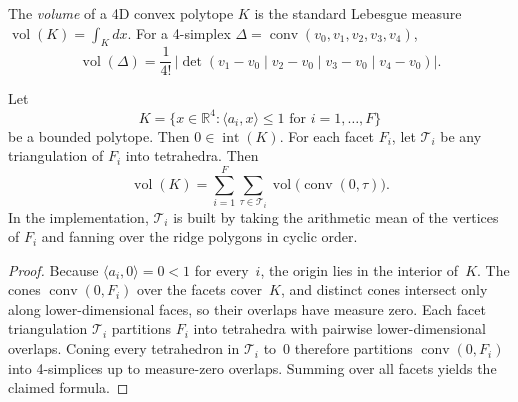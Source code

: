
\begin{unverified}
\begin{definition}\label{def:volume}
The \emph{volume} of a 4D convex polytope $K$ is the standard
Lebesgue measure $\operatorname{vol}(K) = \int_K dx$.
For a 4-simplex $\Delta = \operatorname{conv}(v_0,v_1,v_2,v_3,v_4)$,
\[
  \operatorname{vol}(\Delta)
  = \frac{1}{4!}\,
    \left|\det(v_1 - v_0 \mid v_2 - v_0 \mid v_3 - v_0 \mid v_4 - v_0)\right|.
\]
\end{definition}
\end{unverified}

\begin{unverified}
\begin{lemma}\label{lem:volume-star-triangulation}
Let
\[
  K = \{x \in \mathbb{R}^4 : \langle a_i, x \rangle \leq 1 \text{ for } i=1,\ldots,F\}
\]
be a bounded polytope. Then $0 \in \operatorname{int}(K)$. For each facet
$F_i$, let $\mathcal{T}_i$ be any triangulation of $F_i$ into tetrahedra.
Then
\[
  \operatorname{vol}(K)
  = \sum_{i=1}^F \sum_{\tau \in \mathcal{T}_i}
    \operatorname{vol}\bigl(\operatorname{conv}(0,\tau)\bigr).
\]
\noindent
In the implementation, $\mathcal{T}_i$ is built by taking the arithmetic
mean of the vertices of $F_i$ and fanning over the ridge polygons in cyclic
order.
\end{lemma}

\begin{proof}
Because $\langle a_i, 0 \rangle = 0 < 1$ for every~$i$, the origin lies in
the interior of~$K$. The cones $\operatorname{conv}(0,F_i)$ over the facets
cover~$K$, and distinct cones intersect only along lower-dimensional faces,
so their overlaps have measure zero. Each facet triangulation $\mathcal{T}_i$
partitions $F_i$ into tetrahedra with pairwise lower-dimensional overlaps.
Coning every tetrahedron in $\mathcal{T}_i$ to~$0$ therefore partitions
$\operatorname{conv}(0,F_i)$ into 4-simplices up to measure-zero overlaps.
Summing over all facets yields the claimed formula.
\end{proof}
\end{unverified}



